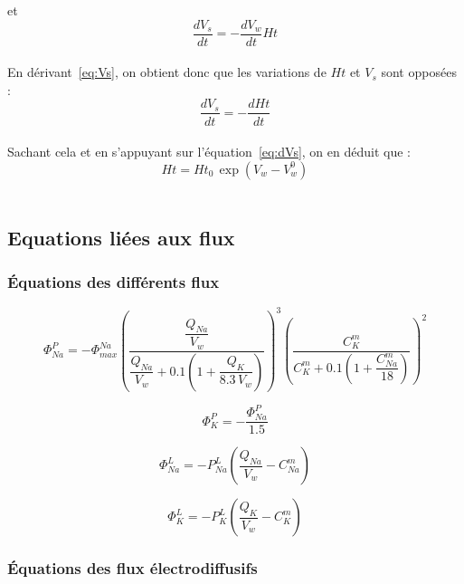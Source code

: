 \documentclass[a4paper,fleqn]{article}
\begin{document}
et
\begin{equation}
\dfrac{dV_s}{dt} = -\dfrac{dV_w}{dt}Ht \label{eq:dVs}
\end{equation}\\

En dérivant~\eqref{eq:Vs}, on obtient donc que les variations de $Ht$ et $V_s$ sont opposées :
\begin{equation}
\dfrac{dV_s}{dt} = -\dfrac{dHt}{dt}
\end{equation} \\

Sachant cela et en s'appuyant sur l'équation~\eqref{eq:dVs}, on en déduit que :
\begin{equation}
Ht = Ht_0\,\exp{(V_w-V_w^0)} \label{eq:Ht} 
\end{equation}\\

\subsection{Equations liées aux flux}
\subsubsection*{Équations des différents flux}

\begin{equation}
\Phi_{Na}^{P}=-\Phi_{max}^{Na}\left(\frac{\dfrac{Q_{Na}}{V_w}}{\dfrac{Q_{Na}}{V_w} + 0.1\left(1+\dfrac{Q_{K}}{8.3\,V_w}\right)}\right)^3\left(\dfrac{C_{K}^{m}}{C_{K}^{m}+0.1\left(1+\dfrac{C_{Na}^{m}}{18}\right)}\right)^2
\end{equation}

\begin{equation}
\Phi_{K}^{P}=-\frac{\Phi_{Na}^{P}}{1.5}
\end{equation}

\begin{equation}
\Phi_{Na}^{L}=-P_{Na}^{L}\left(\frac{Q_{Na}}{V_w}-C_{Na}^{m}\right)
\end{equation}

\begin{equation}
\Phi_{K}^{L}=-P_{K}^{L}\left(\frac{Q_{K}}{V_w}-C_{K}^{m}\right)
\end{equation}

\subsubsection*{Équations des flux électrodiffusifs}
\end{document}
